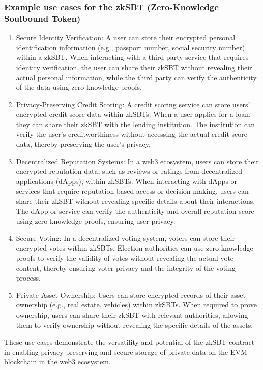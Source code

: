 \documentclass{article}
\begin{document}
\subsubsection{Example use cases for the zkSBT (Zero-Knowledge Soulbound Token)}
\begin{enumerate}
\item Secure Identity Verification: A user can store their encrypted personal identification information (e.g., passport number, social security number) within a zkSBT. When interacting with a third-party service that requires identity verification, the user can share their zkSBT without revealing their actual personal information, while the third party can verify the authenticity of the data using zero-knowledge proofs.
\item Privacy-Preserving Credit Scoring: A credit scoring service can store users' encrypted credit score data within zkSBTs. When a user applies for a loan, they can share their zkSBT with the lending institution. The institution can verify the user's creditworthiness without accessing the actual credit score data, thereby preserving the user's privacy.
\item Decentralized Reputation Systems: In a web3 ecosystem, users can store their encrypted reputation data, such as reviews or ratings from decentralized applications (dApps), within zkSBTs. When interacting with dApps or services that require reputation-based access or decision-making, users can share their zkSBT without revealing specific details about their interactions. The dApp or service can verify the authenticity and overall reputation score using zero-knowledge proofs, ensuring user privacy.
\item Secure Voting: In a decentralized voting system, voters can store their encrypted votes within zkSBTs. Election authorities can use zero-knowledge proofs to verify the validity of votes without revealing the actual vote content, thereby ensuring voter privacy and the integrity of the voting process.
\item Private Asset Ownership: Users can store encrypted records of their asset ownership (e.g., real estate, vehicles) within zkSBTs. When required to prove ownership, users can share their zkSBT with relevant authorities, allowing them to verify ownership without revealing the specific details of the assets.
\end{enumerate}
These use cases demonstrate the versatility and potential of the zkSBT contract in enabling privacy-preserving and secure storage of private data on the EVM blockchain in the web3 ecosystem.
\end{document}
